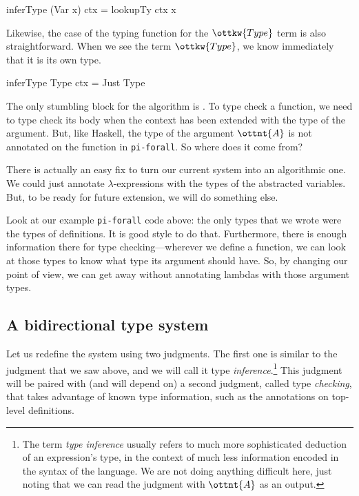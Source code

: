 \documentclass{article}
\newcommand\pif{\texttt{pi-forall}\xspace}
\theoremstyle{definition}
\begin{document}
\begin{haskell}
inferType (Var x) ctx = lookupTy ctx x
\end{haskell}

\noindent
Likewise, the case of the typing function for the $\ottkw{Type}$ term is also
straightforward. When we see the term $\ottkw{Type}$, we know immediately that it
is its own type.

\begin{haskell}
inferType Type ctx = Just Type
\end{haskell}

The only stumbling block for the algorithm is . To type check a
function, we need to type check its body when the context has been extended
with the type of the argument. But, like Haskell, the type of the argument
$\ottnt{A}$ is not annotated on the function in \pif. So where does it come from?

There is actually an easy fix to turn our current system into an algorithmic
one. We could just annotate $\lambda$-expressions with the types of the
abstracted variables.  But, to be ready for future extension, we will do
something else.

Look at our example \pif code above: the only types that we wrote were the
types of definitions. It is good style to do that. Furthermore, there is
enough information there for type checking---wherever we define a function, we
can look at those types to know what type its argument should have.  So, by
changing our point of view, we can get away without annotating lambdas with
those argument types.

\subsection{A bidirectional type system}

Let us redefine the system using two judgments. The first one is similar to the
judgment that we saw above, and we will call it type
\emph{inference}.\footnote{The term \emph{type inference} usually refers to
  much more sophisticated deduction of an expression's type, in the context of
  much less information encoded in the syntax of the language. We are not doing
  anything difficult here, just noting that we can read the judgment with
  $\ottnt{A}$ as an output. } This judgment will be paired with (and will depend
on) a second judgment, called type \emph{checking}, that takes advantage of
known type information, such as the annotations on top-level definitions.
\end{document}
